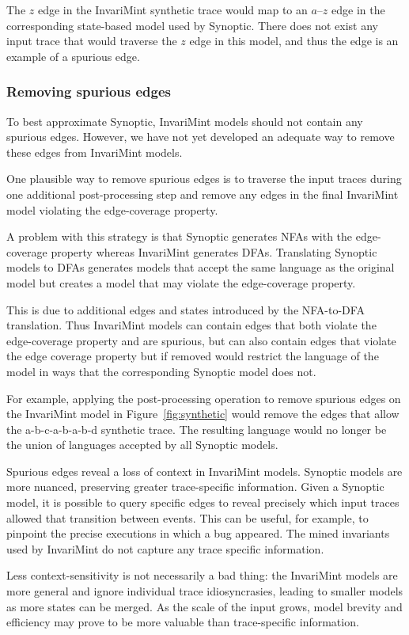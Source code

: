 The $z$ edge in the InvariMint synthetic trace would map to an $a$--$z$
edge in the corresponding state-based model used by Synoptic. There does not
exist any input trace that would traverse the $z$ edge in this model, and thus
the edge is an 
example of a spurious edge.

\subsubsection{Removing spurious edges}
To best approximate Synoptic, InvariMint models should not contain any spurious
edges. However, we have not yet developed an adequate way to remove these 
edges from InvariMint models.

One plausible way to remove spurious edges is to traverse the input traces
during one additional post-processing step and remove any edges in the final
InvariMint model violating the edge-coverage property.

A problem with this
strategy is that Synoptic generates NFAs with the edge-coverage property whereas
InvariMint generates DFAs. Translating Synoptic models to DFAs generates models
that accept the same language as the original model but creates a model that may
violate the edge-coverage
property.

This is due to additional edges and states introduced by the NFA-to-DFA
translation. Thus InvariMint models can contain
edges
that both violate the edge-coverage property and are spurious, but 
can also contain edges that 
violate the edge coverage property but if removed would restrict
the language of the model in ways that the corresponding Synoptic model does not.

For example, applying the post-processing operation to remove spurious edges
on the InvariMint model in Figure~\ref{fig:synthetic} would remove the edges
that allow the a-b-c-a-b-a-b-d synthetic trace. The resulting language 
would no longer be the union of languages accepted by all Synoptic models.

Spurious edges reveal a loss of context in InvariMint models. Synoptic models
are more nuanced, preserving greater trace-specific information.
Given a Synoptic model, it is possible to query specific edges
to reveal precisely which 
input traces allowed that transition between events. This can be useful, for
example, to pinpoint
the precise executions in which a bug appeared. The mined invariants used by
InvariMint do not capture any trace specific information.

Less context-sensitivity is not necessarily a bad thing: the InvariMint models
are more
general and ignore individual trace idiosyncrasies, leading to smaller
models as more states can be merged. As the scale of the input grows, 
model brevity and efficiency may prove to be more valuable than trace-specific
information.
